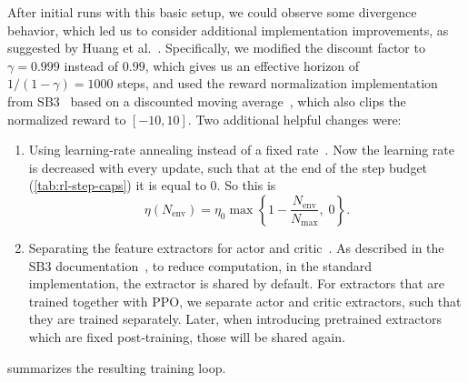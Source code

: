 After initial runs with this basic setup, we could observe some divergence behavior, which
led us to consider additional implementation improvements, as suggested by Huang et al.~\cite{Huang2022Implementation}.
Specifically, we modified the discount factor to $\gamma = 0.999$ instead of $0.99$, which gives us an effective horizon
of $1/(1-\gamma) = 1000$ steps, and used the reward normalization implementation from SB3~\cite{StableBaselines2026VecNormalize} based
on a discounted moving average~\cite[continuous-action Detail~8]{Huang2022Implementation}, which
also clips the normalized reward to $[-10, 10]$. Two additional helpful changes were:
\begin{enumerate}
    \item Using learning-rate annealing instead of a fixed rate~\cite[Detail~4]{Huang2022Implementation}. Now the learning
    rate is decreased with every update, such that at the end of the step budget (\cref{tab:rl-step-caps}) it is equal
    to $0$. So this is
    \begin{equation}
        \label{eq:lr-annealing}
        \eta(N_{\mathrm{env}}) = \eta_0 \max\left\{ 1 - \frac{N_{\mathrm{env}}}{N_{\max}}, \; 0 \right\} .
    \end{equation}
    \item Separating the feature extractors for actor and critic~\cite[Detail~13]{Huang2022Implementation}. As described
    in the SB3 documentation~\cite{StableBaselines2026Policy}, to reduce computation, in the standard implementation,
    the extractor is shared by default. For extractors that are trained together with PPO, we separate actor and
    critic extractors, such that they are trained separately. Later, when introducing pretrained extractors which are fixed
    post-training, those will be shared again.
\end{enumerate}
 summarizes the resulting training loop.
